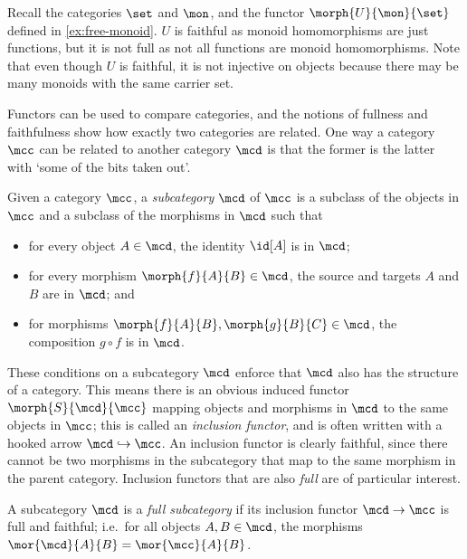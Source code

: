 \begin{example}
    Recall the categories \(\set\) and \(\mon\), and the functor
    \(\morph{U}{\mon}{\set}\) defined in \cref{ex:free-monoid}.
    \(U\) is faithful as monoid homomorphisms are just functions, but it is not
    full as not all functions are monoid homomorphisms.
    Note that even though \(U\) is faithful, it is not injective on objects
    because there may be many monoids with the same carrier set.
\end{example}

Functors can be used to compare categories, and the notions of fullness and
faithfulness show how exactly two categories are related.
One way a category \(\mcc\) can be related to another category \(\mcd\) is that
the former is the latter with `some of the bits taken out'.

\begin{definition}[Subcategory]
    Given a category \(\mcc\), a \emph{subcategory} \(\mcd\) of \(\mcc\) is a
    subclass of the objects in \(\mcc\) and a subclass of the morphisms in
    \(\mcd\) such that
    \begin{itemize}
        \item for every object \(A \in \mcd\), the identity \(\id[A]\) is in
              \(\mcd\);
        \item for every morphism \(\morph{f}{A}{B} \in \mcd\), the source and
              targets \(A\) and \(B\) are in \(\mcd\); and
        \item for morphisms \(\morph{f}{A}{B}, \morph{g}{B}{C} \in \mcd\), the
              composition \(g \circ f\) is in \(\mcd\).
    \end{itemize}
\end{definition}

These conditions on a subcategory \(\mcd\) enforce that \(\mcd\) also has the
structure of a category.
This means there is an obvious induced functor \(\morph{S}{\mcd}{\mcc}\) mapping
objects and morphisms in \(\mcd\) to the same objects in \(\mcc\); this is
called an \emph{inclusion functor}, and is often written with a hooked arrow
\(\mcd \hookrightarrow \mcc\).
An inclusion functor is clearly faithful, since there cannot be two morphisms in
the subcategory that map to the same morphism in the parent category.
Inclusion functors that are also \emph{full} are of particular interest.

\begin{definition}
    A subcategory \(\mcd\) is a \emph{full subcategory} if its inclusion functor
    \(\mcd \to \mcc\) is full and faithful; i.e.\ for all objects
    \(A, B \in \mcd\), the morphisms \(\mor{\mcd}{A}{B} = \mor{\mcc}{A}{B}\).
\end{definition}

